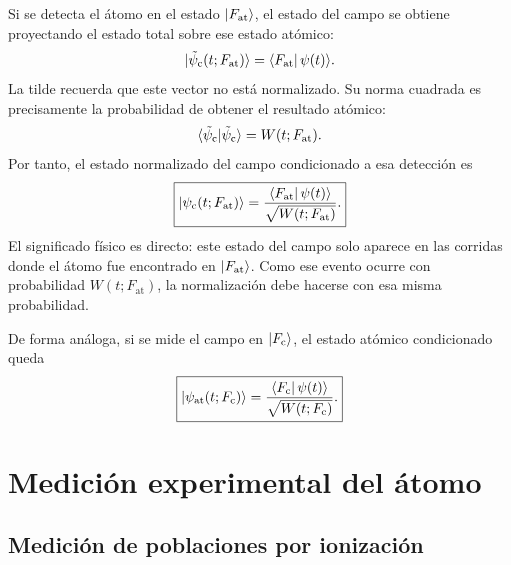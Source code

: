 \documentclass[11pt]{article}
\begin{document}
Si se detecta el \'atomo en el estado $\ket{F_{\mathrm{at}}}$, el estado del
campo se obtiene proyectando el estado total sobre ese estado at\'omico:
\begin{equation}
  \ket{\tilde\psi_{\mathrm{c}}(t;F_{\mathrm{at}})}
  =
  \bra{F_{\mathrm{at}}}\psi(t)\rangle .
\end{equation}
La tilde recuerda que este vector no est\'a normalizado. Su norma cuadrada es
precisamente la probabilidad de obtener el resultado at\'omico:
\begin{equation}
  \braket{\tilde\psi_{\mathrm{c}}|\tilde\psi_{\mathrm{c}}}
  =
  W(t;F_{\mathrm{at}}).
\end{equation}
Por tanto, el estado normalizado del campo condicionado a esa detecci\'on es
\begin{equation}
  \boxed{
  \ket{\psi_{\mathrm{c}}(t;F_{\mathrm{at}})}
  =
  \frac{
  \bra{F_{\mathrm{at}}}\psi(t)\rangle
  }{
  \sqrt{W(t;F_{\mathrm{at}})}
  } .
  }
\end{equation}
El significado f\'isico es directo: este estado del campo solo aparece en las
corridas donde el \'atomo fue encontrado en $\ket{F_{\mathrm{at}}}$. Como ese
evento ocurre con probabilidad $W(t;F_{\mathrm{at}})$, la normalizaci\'on debe
hacerse con esa misma probabilidad.

De forma an\'aloga, si se mide el campo en $\ket{F_{\mathrm{c}}}$, el estado
at\'omico condicionado queda
\begin{equation}
  \boxed{
  \ket{\psi_{\mathrm{at}}(t;F_{\mathrm{c}})}
  =
  \frac{
  \bra{F_{\mathrm{c}}}\psi(t)\rangle
  }{
  \sqrt{W(t;F_{\mathrm{c}})}
  } .
  }
\end{equation}

\section{Medici\'on experimental del \'atomo}

\subsection{Medici\'on de poblaciones por ionizaci\'on}
\end{document}
